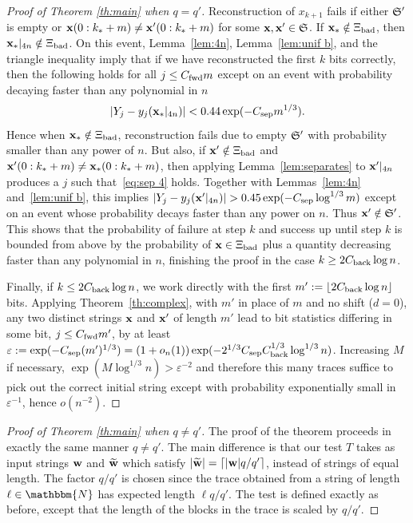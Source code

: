 \documentclass[final,12pt]{colt2018} %
\newcommand{\N}{\mathbbm{N}}
\newcommand{\1}{\mathbf{1}}
\def\cSS{\frak{S}}
\newcommand{\eqb}{\begin{equation}}
\newcommand{\eqe}{\end{equation}}
\newcommand{\wt}{\widetilde}
\def\x{{\bf x}}
\def\w{{\bf w}}
\def\ee{\varepsilon}
\def\csep{C_{\rm sep}} %
\def\cfwd{C_{\rm fwd}} %
\def\cback{C_{\rm back}}
\def\bad{{\Xi_{\rm bad}}}
\begin{document}
\begin{proof}[Proof of Theorem \ref{th:main} when $q = q'$]
	Reconstruction of $x_{k+1}$ fails if either $\cSS'$ is empty or
	$\x(0:k_* + m) \neq \x'(0:k_* + m)$ for some $\x, \x' \in \cSS$.
	If $\x_* \notin \bad$, then $\x_*|_{4n} \notin \bad$. On this event, Lemma~\ref{lem:4n}, Lemma~\ref{lem:unif b},
	and the triangle inequality imply that if we have reconstructed the first $k$ bits correctly, then the following holds for all $j \leq \cfwd m$ except on an event with probability decaying faster than any polynomial in $n$
	\eqb \label{eq:sup}
	|Y_j - y_j (\x_*|_{4n})|    < 0.44 \exp ( - \csep m^{1/3}).
	\eqe
	Hence when $\x_* \notin \bad$, reconstruction fails due to empty $\cSS'$ with probability smaller than any power of $n$.
	But also, if $\x' \notin \bad$
	and $\x'(0:k_* + m) \neq \x_* (0 : k_* + m)$,
	then applying Lemma~\ref{lem:separates} to $\x'|_{4n}$ produces a $j$
	such that~\eqref{eq:sep 4} holds. Together with Lemmas~\ref{lem:4n}
	and~\ref{lem:unif b}, this implies $|Y_j - y_j (\x'|_{4n})| >
	0.45\exp (- \csep \log^{1/3} m)$ except on an event whose probability decays faster than any power on $n$.  Thus $\x' \notin \cSS'$.
	This shows that the probability of failure at step $k$ and success
	up until step $k$ is bounded from above by the probability of
	$\x \in \bad$ plus a quantity decreasing faster than any polynomial
	in $n$, finishing the proof in the case $k \geq 2 \cback \log n$.
	
	Finally, if $k \leq 2 \cback \log n$, we work directly with the
	first $m' := \lfloor 2 \cback \log n\rfloor $ bits.  Applying Theorem~\ref{th:complex},
	with $m'$ in place of $m$ and no shift ($d = 0$), any two
	distinct strings $\x$ and $\x'$ of length $m'$ lead to bit statistics
	differing in some bit, $j \leq \cfwd m'$, by at least $\ee := \exp
	(- \csep (m')^{1/3}) = (1+o_n(1))\exp (- 2^{1/3} \csep \cback^{1/3} \log^{1/3} n)$.
	Increasing $M$ if necessary,
	$\exp (M \log^{1/3} n) > \ee^{-2}$ and therefore this many
	traces suffice to pick out the correct initial string except
	with probability exponentially small in $\ee^{-1}$, hence $o(n^{-2})$.
\end{proof}


\begin{proof}[Proof of Theorem \ref{th:main} when $q \neq q'$]
	The proof of the theorem proceeds in exactly the same manner $q\neq q'$. The main difference is that our test $T$ takes as input strings $\w$ and $\wt\w$ which satisfy $|\wt\w|=\lceil |\w|q/q' \rceil$, instead of strings of equal length. The factor $q/q'$ is chosen since the trace obtained from a string of length $\ell\in\N$ has expected length $\ell q/q'$. The test is defined exactly as before, except that the length of the blocks in the trace is scaled by $q/q'$.
\end{proof}
\end{document}
